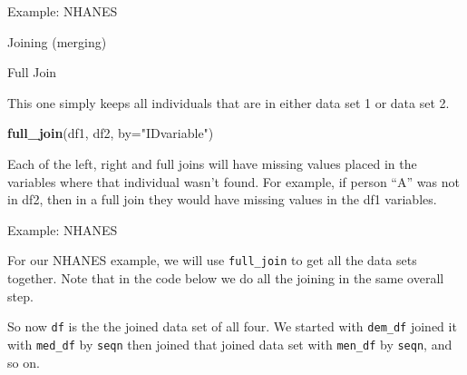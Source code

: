 \documentclass[ignorenonframetext,]{beamer}
\newenvironment{Shaded}{\begin{snugshade}}{\end{snugshade}}
\newcommand{\KeywordTok}[1]{\textcolor[rgb]{0.13,0.29,0.53}{\textbf{{#1}}}}
\newcommand{\DataTypeTok}[1]{\textcolor[rgb]{0.13,0.29,0.53}{{#1}}}
\newcommand{\StringTok}[1]{\textcolor[rgb]{0.31,0.60,0.02}{{#1}}}
\newcommand{\NormalTok}[1]{{#1}}
\begin{document}
\begin{frame}[fragile]{Example: NHANES}

\begin{block}{Joining (merging)}

\begin{block}{Full Join}

This one simply keeps all individuals that are in either data set 1 or
data set 2.

\begin{Shaded}
\begin{Highlighting}[]
\KeywordTok{full_join}\NormalTok{(df1, df2, }\DataTypeTok{by=}\StringTok{"IDvariable"}\NormalTok{)}
\end{Highlighting}
\end{Shaded}

Each of the left, right and full joins will have missing values placed
in the variables where that individual wasn't found. For example, if
person ``A'' was not in df2, then in a full join they would have missing
values in the df1 variables.

\end{block}

\end{block}

\end{frame}

\begin{frame}[fragile]{Example: NHANES}

For our NHANES example, we will use \texttt{full\_join} to get all the
data sets together. Note that in the code below we do all the joining in
the same overall step.

\begin{Shaded}
\end{Shaded}

So now \texttt{df} is the the joined data set of all four. We started
with \texttt{dem\_df} joined it with \texttt{med\_df} by \texttt{seqn}
then joined that joined data set with \texttt{men\_df} by \texttt{seqn},
and so on.

\end{frame}
\end{document}
